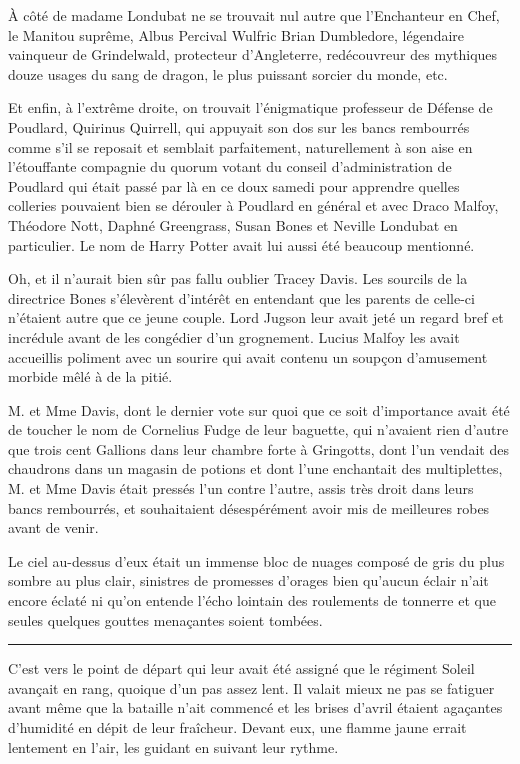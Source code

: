 À côté de madame Londubat ne se trouvait nul autre que l'Enchanteur en Chef, le Manitou suprême, Albus Percival Wulfric Brian Dumbledore, légendaire vainqueur de Grindelwald, protecteur d'Angleterre, redécouvreur des mythiques douze usages du sang de dragon, le plus puissant sorcier du monde, etc.

Et enfin, à l'extrême droite, on trouvait l'énigmatique professeur de Défense de Poudlard, Quirinus Quirrell, qui appuyait son dos sur les bancs rembourrés comme s'il se reposait et semblait parfaitement, naturellement à son aise en l'étouffante compagnie du quorum votant du conseil d'administration de Poudlard qui était passé par là en ce doux samedi pour apprendre quelles colleries pouvaient bien se dérouler à Poudlard en général et avec Draco Malfoy, Théodore Nott, Daphné Greengrass, Susan Bones et Neville Londubat en particulier. Le nom de Harry Potter avait lui aussi été beaucoup mentionné.

Oh, et il n'aurait bien sûr pas fallu oublier Tracey Davis. Les sourcils de la directrice Bones s'élevèrent d'intérêt en entendant que les parents de celle-ci n'étaient autre que ce jeune couple. Lord Jugson leur avait jeté un regard bref et incrédule avant de les congédier d'un grognement. Lucius Malfoy les avait accueillis poliment avec un sourire qui avait contenu un soupçon d'amusement morbide mêlé à de la pitié.

M. et Mme Davis, dont le dernier vote sur quoi que ce soit d'importance avait été de toucher le nom de Cornelius Fudge de leur baguette, qui n'avaient rien d'autre que trois cent Gallions dans leur chambre forte à Gringotts, dont l'un vendait des chaudrons dans un magasin de potions et dont l'une enchantait des multiplettes, M. et Mme Davis était pressés l'un contre l'autre, assis très droit dans leurs bancs rembourrés, et souhaitaient désespérément avoir mis de meilleures robes avant de venir.

Le ciel au-dessus d'eux était un immense bloc de nuages composé de gris du plus sombre au plus clair, sinistres de promesses d'orages bien qu'aucun éclair n'ait encore éclaté ni qu'on entende l'écho lointain des roulements de tonnerre et que seules quelques gouttes menaçantes soient tombées.
\par\noindent\rule{\textwidth}{0.4pt}
C'est vers le point de départ qui leur avait été assigné que le régiment Soleil avançait en rang, quoique d'un pas assez lent. Il valait mieux ne pas se fatiguer avant même que la bataille n'ait commencé et les brises d'avril étaient agaçantes d'humidité en dépit de leur fraîcheur. Devant eux, une flamme jaune errait lentement en l'air, les guidant en suivant leur rythme.

